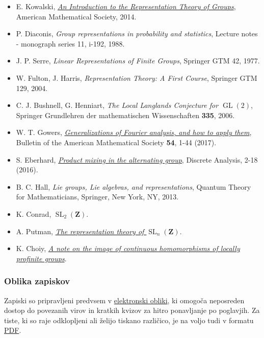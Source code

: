 \documentclass[11pt]{book}
\def\ZZ{\mathbf{Z}}
\DeclareMathOperator\GL{GL}
\DeclareMathOperator\SL{SL}
\def\literatura{\color{modra}}
\theoremstyle{definition}
\theoremstyle{zgled}
\theoremstyle{zgledbrezstevilke}
\theoremstyle{odprtproblem}
\theoremstyle{domacanaloga}
\theoremstyle{izrek}
\begin{document}
\begin{itemize}
\item {\literatura E. Kowalski, {\em \href{https://people.math.ethz.ch/~kowalski/representation-theory.pdf}{An Introduction to the Representation Theory of Groups}}, American Mathematical Society, 2014.} 
\item {\literatura P. Diaconis, {\em Group representations in probability and statistics}, Lecture notes - monograph series 11, i-192, 1988.}
\item {\literatura J. P. Serre, {\em Linear Representations of Finite Groups}, Springer GTM 42, 1977.}
\item {\literatura W. Fulton, J. Harris, {\em Representation Theory: A First Course}, Springer GTM 129, 2004.}
\item {\literatura C. J. Bushnell, G. Henniart, {\em The Local Langlands Conjecture for $\GL(2)$}, Springer Grundlehren der mathematischen Wissenschaften \textbf{335}, 2006.}
\item {\literatura W. T. Gowers, {\em \href{https://arxiv.org/abs/1608.04127}{Generalizations of Fourier analysis, and how to apply them}},  Bulletin of the American Mathematical Society \textbf{54}, 1-44 (2017).}
\item {\literatura S. Eberhard, {\em \href{https://arxiv.org/abs/1512.03517}{Product mixing in the alternating group}}, Discrete Analysis, 2-18 (2016).}
\item {\literatura B. C. Hall, {\em Lie groups, Lie algebras, and representations}, Quantum Theory for Mathematicians, Springer, New York, NY, 2013.}
\item {\literatura K. Conrad, {\em \href{https://kconrad.math.uconn.edu/blurbs/grouptheory/SL(2,Z).pdf}{$\SL_2(\ZZ)$}}.}
\item {\literatura A. Putman, {\em \href{https://www3.nd.edu/~andyp/notes/RepTheorySLnZ.pdf}{The representation theory of $\SL_n(\ZZ)$}}.}
\item {\literatura K. Choiy, {\em \href{https://www.math.purdue.edu/~tongliu/teaching/598/p-adicrep.pdf}{A note on the image of continuous homomorphisms of locally profinite groups}}.}
\end{itemize}

\newpage

\subsubsection{Oblika zapiskov}

Zapiski so pripravljeni predvsem v \href{https://urbanjezernik.github.io/teorija-upodobitev/}{elektronski obliki}, ki omogoča neposreden dostop do povezanih virov in kratkih kvizov za hitro ponavljanje po poglavjih. Za tiste, ki so raje odklopljeni ali želijo tiskano različico, je na voljo tudi v formatu \href{https://github.com/urbanjezernik/teorija-upodobitev/blob/main/upodobitve.pdf}{PDF}.
\end{document}
